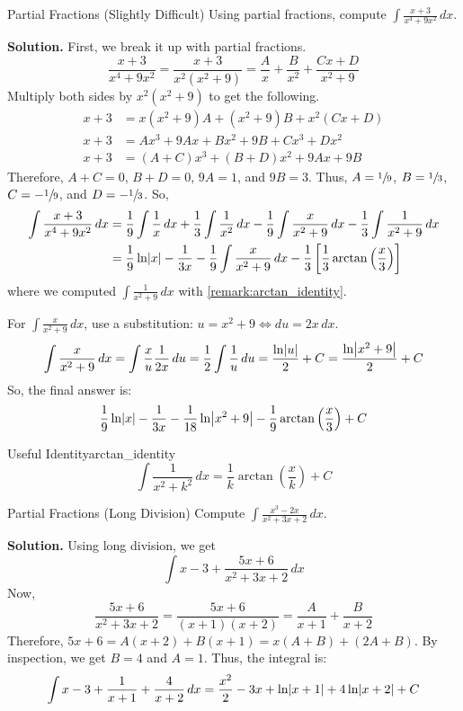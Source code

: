 \begin{Example}{Partial Fractions (Slightly Difficult)}{}
    Using partial fractions, compute $ \displaystyle \int \frac{x+3}{x^4+9x^2} \, d{x} $.

    \textbf{Solution.}
    First, we break it up with partial fractions.
    \[ \frac{x+3}{x^4+9x^2} =\frac{x+3}{x^2(x^2+9)}=\frac{A}{x}+\frac{B}{x^2} +\frac{Cx+D}{x^2+9}  \]
    Multiply both sides by $ x^2(x^2+9) $ to get the following.
    \begin{align*}
        x+3 & =x(x^2+9)A+(x^2+9)B+x^2(Cx+D) \\
        x+3 & =Ax^3+9Ax+Bx^2+9B+Cx^3+Dx^2   \\
        x+3 & =(A+C)x^3+(B+D)x^2+9Ax+9B
    \end{align*}
    Therefore, $ A+C=0 $, $ B+D=0 $, $ 9A=1 $, and $ 9B=3 $. Thus,
    $ A=\sfrac{1}{9} $, $ B=\sfrac{1}{3} $, $ C=-\sfrac{1}{9} $,
    and $ D=-\sfrac{1}{3} $. So,
    \begin{align*}
        \int \frac{x+3}{x^4+9x^2} \, d{x}
         & =\frac{1}{9} \int \frac{1}{x} \, d{x} +\frac{1}{3} \int \frac{1}{x^2} \, d{x}
        -\frac{1}{9} \int \frac{x}{x^2+9} \, d{x} -\frac{1}{3} \int \frac{1}{x^2+9} \, d{x} \\
         & =\frac{1}{9}\ln\lvert x\rvert-\frac{1}{3x}-\frac{1}{9} \int \frac{x}{x^2+9}\, d{x}
        -\frac{1}{3} \left[ \frac{1}{3}\arctan\left( \frac{x}{3}  \right) \right]           \\
    \end{align*}
    where we computed $ \displaystyle \int \frac{1}{x^2+9}\,d{x} $ with \cref{remark:arctan_identity}.

    For $ \displaystyle \int \frac{x}{x^2+9} \, d{x}  $, use a substitution: $ u=x^2+9\iff du=2x\,dx $.
    \[
        \int \frac{x}{x^2+9} \, d{x}
        =\int \frac{x}{u} \frac{1}{2x} \, d{u}
        =\frac{1}{2} \int \frac{1}{u} \, d{u}
        =\frac{\ln\abs{u}}{2} +C
        =\frac{\ln\abs*{x^2+9}}{2} +C
    \]
    So, the final answer is:
    \[ \frac{1}{9}\ln\abs{x}-\frac{1}{3x}-\frac{1}{18}\ln\abs*{x^2+9}
        -\frac{1}{9} \arctan\left( \frac{x}{3}  \right)+C \]
\end{Example}

\begin{Remark}{Useful Identity}{arctan_identity}
    \[ \int \frac{1}{x^2+k^2} \, d{x}=\frac{1}{k} \arctan\left( \frac{x}{k}  \right)+C  \]
\end{Remark}

\begin{Example}{Partial Fractions (Long Division)}{}
    Compute $ \displaystyle \int \frac{x^3-2x}{x^2+3x+2} \, d{x} $.

    \textbf{Solution.}
    Using long division, we get
    \[ \int x-3+\frac{5x+6}{x^2+3x+2} \, d{x}  \]
    Now,
    \[ \frac{5x+6}{x^2+3x+2} =\frac{5x+6}{(x+1)(x+2)} =\frac{A}{x+1} +\frac{B}{x+2} \]
    Therefore, $ 5x+6=A(x+2)+B(x+1) = x(A+B)+(2A+B)$. By inspection,
    we get $ B=4 $ and $ A=1 $. Thus, the integral is:
    \[ \int x-3+\frac{1}{x+1} +\frac{4}{x+2} \, d{x} =\frac{x^2}{2} -3x+\ln\lvert x+1\rvert
        +4\ln\lvert x+2\rvert+C \]
\end{Example}
